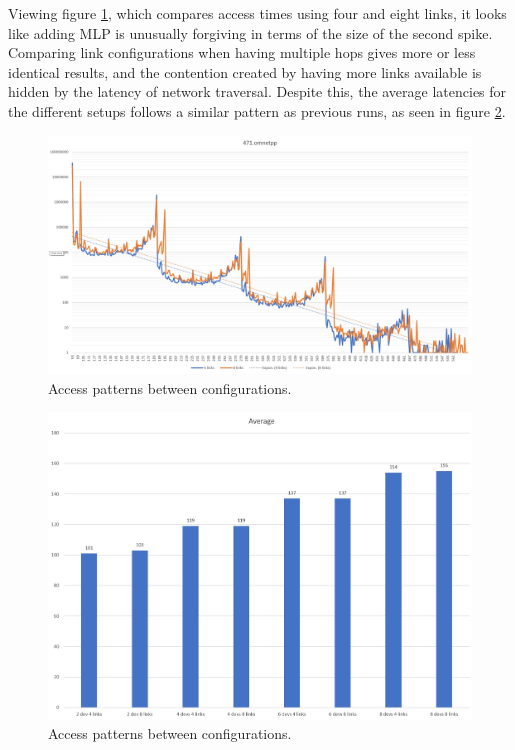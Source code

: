 Viewing figure \ref{Memory-access-471-link-compare}, which compares access times using four and eight links, it looks like adding MLP is unusually forgiving in terms of the size of the second spike. Comparing link configurations when having multiple hops gives more or less identical results, and the contention created by having more links available is hidden by the latency of network traversal. Despite this, the average latencies for the different setups follows a similar pattern as previous runs, as seen in figure \ref{Memory-access-471-averages}.

\begin{figure}[!ht]
    \centering
    \includegraphics[width=0.75\linewidth]{figure/471-2_4-8.jpg}
    \caption{Access patterns between configurations.}
    \label{Memory-access-471-link-compare}
\end{figure}

\begin{figure}[!ht]
    \centering
    \includegraphics[width=0.75\linewidth]{figure/471-averages.jpg}
    \caption{Access patterns between configurations.}
    \label{Memory-access-471-averages}
\end{figure}


